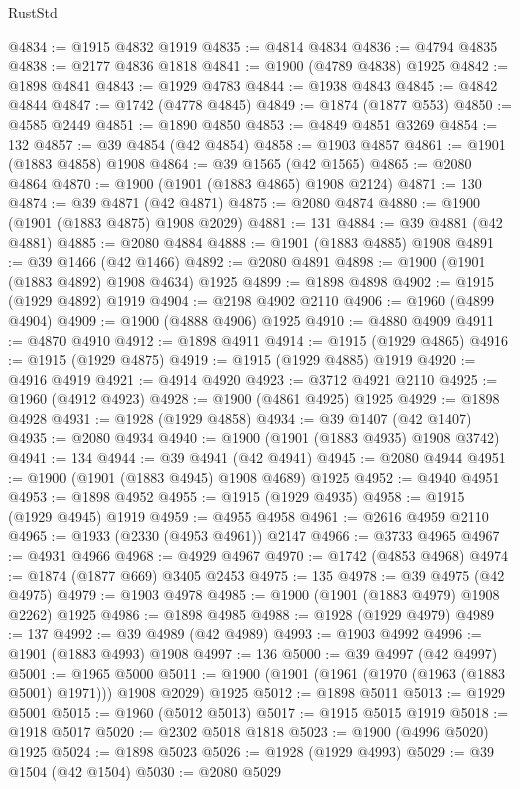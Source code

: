 \begin{lexlean}{RustStd}
\begin{coremodule}
{\begin{coremodule}
{{{{{{{{{{{{{{{{{{{{{{{{{{{{{{{{{{{{{{{{{{{@4834 := @1915 @4832 @1919
@4835 := @4814 @4834
@4836 := @4794 @4835
@4838 := @2177 @4836 @1818
@4841 := @1900 (@4789 @4838) @1925
@4842 := @1898 @4841
@4843 := @1929 @4783
@4844 := @1938 @4843
@4845 := @4842 @4844
@4847 := @1742 (@4778 @4845)
@4849 := @1874 (@1877 @553)
@4850 := @4585 @2449
@4851 := @1890 @4850
@4853 := @4849 @4851 @3269
@4854 := 132
@4857 := @39 @4854 (@42 @4854)
@4858 := @1903 @4857
@4861 := @1901 (@1883 @4858) @1908
@4864 := @39 @1565 (@42 @1565)
@4865 := @2080 @4864
@4870 := @1900 (@1901 (@1883 @4865) @1908 @2124)
@4871 := 130
@4874 := @39 @4871 (@42 @4871)
@4875 := @2080 @4874
@4880 := @1900 (@1901 (@1883 @4875) @1908 @2029)
@4881 := 131
@4884 := @39 @4881 (@42 @4881)
@4885 := @2080 @4884
@4888 := @1901 (@1883 @4885) @1908
@4891 := @39 @1466 (@42 @1466)
@4892 := @2080 @4891
@4898 := @1900 (@1901 (@1883 @4892) @1908 @4634) @1925
@4899 := @1898 @4898
@4902 := @1915 (@1929 @4892) @1919
@4904 := @2198 @4902 @2110
@4906 := @1960 (@4899 @4904)
@4909 := @1900 (@4888 @4906) @1925
@4910 := @4880 @4909
@4911 := @4870 @4910
@4912 := @1898 @4911
@4914 := @1915 (@1929 @4865)
@4916 := @1915 (@1929 @4875)
@4919 := @1915 (@1929 @4885) @1919
@4920 := @4916 @4919
@4921 := @4914 @4920
@4923 := @3712 @4921 @2110
@4925 := @1960 (@4912 @4923)
@4928 := @1900 (@4861 @4925) @1925
@4929 := @1898 @4928
@4931 := @1928 (@1929 @4858)
@4934 := @39 @1407 (@42 @1407)
@4935 := @2080 @4934
@4940 := @1900 (@1901 (@1883 @4935) @1908 @3742)
@4941 := 134
@4944 := @39 @4941 (@42 @4941)
@4945 := @2080 @4944
@4951 := @1900 (@1901 (@1883 @4945) @1908 @4689) @1925
@4952 := @4940 @4951
@4953 := @1898 @4952
@4955 := @1915 (@1929 @4935)
@4958 := @1915 (@1929 @4945) @1919
@4959 := @4955 @4958
@4961 := @2616 @4959 @2110
@4965 := @1933 (@2330 (@4953 @4961)) @2147
@4966 := @3733 @4965
@4967 := @4931 @4966
@4968 := @4929 @4967
@4970 := @1742 (@4853 @4968)
@4974 := @1874 (@1877 @669) @3405 @2453
@4975 := 135
@4978 := @39 @4975 (@42 @4975)
@4979 := @1903 @4978
@4985 := @1900 (@1901 (@1883 @4979) @1908 @2262) @1925
@4986 := @1898 @4985
@4988 := @1928 (@1929 @4979)
@4989 := 137
@4992 := @39 @4989 (@42 @4989)
@4993 := @1903 @4992
@4996 := @1901 (@1883 @4993) @1908
@4997 := 136
@5000 := @39 @4997 (@42 @4997)
@5001 := @1965 @5000
@5011 := @1900 (@1901 (@1961 (@1970 (@1963 (@1883 @5001) @1971))) @1908 @2029) @1925
@5012 := @1898 @5011
@5013 := @1929 @5001
@5015 := @1960 (@5012 @5013)
@5017 := @1915 @5015 @1919
@5018 := @1918 @5017
@5020 := @2302 @5018 @1818
@5023 := @1900 (@4996 @5020) @1925
@5024 := @1898 @5023
@5026 := @1928 (@1929 @4993)
@5029 := @39 @1504 (@42 @1504)
@5030 := @2080 @5029
}}}}}}}}}}}}}}}}}}}}}}}}}}}}}}}}}}}}}}}}}}}
\end{coremodule}}
\end{coremodule}
\end{lexlean}
